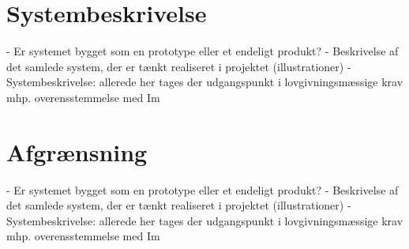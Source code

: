 \section{Systembeskrivelse}
- Er systemet bygget som en prototype eller et endeligt produkt? 
- Beskrivelse af det samlede system, der er tænkt realiseret i projektet (illustrationer)
- Systembeskrivelse: allerede her tages der udgangspunkt i lovgivningsmæssige krav mhp. overensstemmelse med Im

\section{Afgrænsning}
- Er systemet bygget som en prototype eller et endeligt produkt? 
- Beskrivelse af det samlede system, der er tænkt realiseret i projektet (illustrationer)
- Systembeskrivelse: allerede her tages der udgangspunkt i lovgivningsmæssige krav mhp. overensstemmelse med Im

